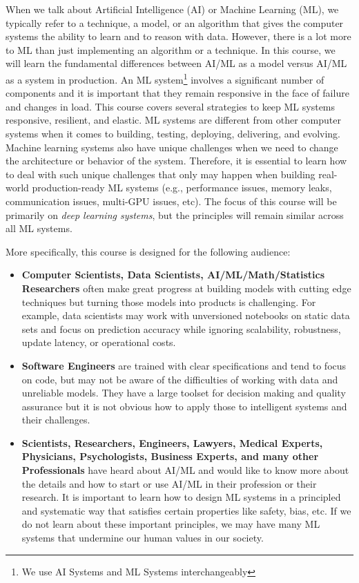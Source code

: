 \documentclass[11pt]{article}
\begin{document}
When we talk about Artificial Intelligence (AI) or Machine Learning (ML), we typically refer to a technique, a model, or an algorithm that gives the computer systems the ability to learn and to reason with data. However, there is a lot more to ML than just implementing an algorithm or a technique. In this course, we will learn the fundamental differences between AI/ML as a model versus AI/ML as a system in production. An ML system\footnote{We use AI Systems and ML Systems interchangeably} involves a significant number of components and it is important that they remain responsive in the face of failure and changes in load. This course covers several strategies to keep ML systems responsive, resilient, and elastic. ML systems are different from other computer systems when it comes to building, testing, deploying, delivering, and evolving. Machine learning systems also have unique challenges when we need to change the architecture or behavior of the system. Therefore, it is essential to learn how to deal with such unique challenges that only may happen when building real-world production-ready ML systems (e.g., performance issues, memory leaks, communication issues, multi-GPU issues, etc). The focus of this course will be primarily on \emph{deep learning systems}, but the principles will remain similar across all ML systems. 

More specifically, this course is designed for the following audience:

\begin{itemize}

\item \textbf{Computer Scientists, Data Scientists, AI/ML/Math/Statistics Researchers} often make great progress at building models with cutting edge techniques but turning those models into products is challenging. For example, data scientists may work with unversioned notebooks on static data sets and focus on prediction accuracy while ignoring scalability, robustness, update latency, or operational costs.

\item \textbf{Software Engineers} are trained with clear specifications and tend to focus on code, but may not be aware of the difficulties of working with data and unreliable models. They have a large toolset for decision making and quality assurance but it is not obvious how to apply those to intelligent systems and their challenges. 

\item \textbf{Scientists, Researchers, Engineers, Lawyers, Medical Experts, Physicians, Psychologists, Business Experts, and many other Professionals} have heard about AI/ML and would like to know more about the details and how to start or use AI/ML in their profession or their research. It is important to learn how to design ML systems in a principled and systematic way that satisfies certain properties like safety, bias, etc. If we do not learn about these important principles, we may have many ML systems that undermine our human values in our society.

\end{itemize}
\end{document}
